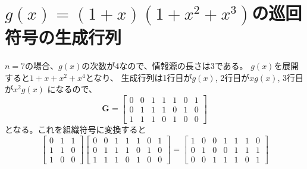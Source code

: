 \documentclass[a4paper,11pt]{jsarticle}
\begin{document}
\section{$g(x)=(1+x)(1+x^2+x^3)$の巡回符号の生成行列}
$n=7$の場合、$g(x)$の次数が4なので、情報源の長さは3である。
$g(x)$を展開すると$1+x+x^2+x^4$となり、
生成行列は1行目が$g(x)$, 2行目が$xg(x)$, 3行目が$x^2g(x)$
になるので、
\[
  {\bm G}=
  \begin{bmatrix}
    0 & 0 & 1 & 1 & 1 & 0 & 1 \\
    0 & 1 & 1 & 1 & 0 & 1 & 0 \\
    1 & 1 & 1 & 0 & 1 & 0 & 0
  \end{bmatrix}
\]
となる。これを組織符号に変換すると
\[
  \begin{bmatrix}
    0 & 1 & 1 \\
    1 & 1 & 0 \\
    1 & 0 & 0
  \end{bmatrix}
  \begin{bmatrix}
    0 & 0 & 1 & 1 & 1 & 0 & 1 \\
    0 & 1 & 1 & 1 & 0 & 1 & 0 \\
    1 & 1 & 1 & 0 & 1 & 0 & 0
  \end{bmatrix}=
  \begin{bmatrix}
    1 & 0 & 0 & 1 & 1 & 1 & 0 \\
    0 & 1 & 0 & 0 & 1 & 1 & 1 \\
    0 & 0 & 1 & 1 & 1 & 0 & 1
  \end{bmatrix}
\]
\end{document}
